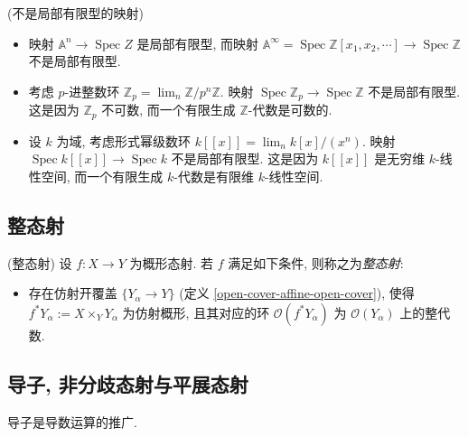 \documentclass{book}
\begin{document}
	\begin{example}
		{(不是局部有限型的映射)}
		\begin{itemize}
			\item 映射 $\mathbb A^n\to\operatorname{Spec} Z$ 是局部有限型, 而映射 $\mathbb A^{\infty}=\operatorname{Spec} \mathbb{Z}[x_1,x_2,\cdots] \to \operatorname{Spec} \mathbb{Z}$ 不是局部有限型.
			\item 考虑 $p$-进整数环 $\mathbb{Z}_p = \lim_n \mathbb{Z}/p^n\mathbb{Z}$. 映射 $\operatorname{Spec} \mathbb{Z}_p \to \operatorname{Spec} \mathbb{Z}$ 不是局部有限型.
			这是因为 $\mathbb{Z}_p$ 不可数, 而一个有限生成 $\mathbb{Z}$-代数是可数的.
			\item 设 $k$ 为域, 考虑形式幂级数环 $k[\![x]\!]=\lim_n k[x]/(x^n)$. 映射 $\operatorname{Spec} k[\![x]\!] \to \operatorname{Spec} k$ 不是局部有限型. 这是因为 $k[\![x]\!]$ 是无穷维 $k$-线性空间, 而一个有限生成 $k$-代数是有限维 $k$-线性空间.
		\end{itemize}
	\end{example}
	
	\subsection{整态射}
	
	\begin{definition}
		{(整态射)}
		设 $f\colon X\to Y$ 为概形态射. 若 $f$ 满足如下条件, 则称之为\emph{整态射}:
		\begin{itemize}
			\item 存在仿射开覆盖 $\{Y_\alpha \to Y\}$ (定义 \ref{open-cover-affine-open-cover}), 使得 $f^*Y_\alpha := X\times_Y Y_\alpha$ 为仿射概形, 且其对应的环 $\mathcal O(f^*Y_\alpha)$ 为 $\mathcal O(Y_\alpha)$ 上的整代数.
		\end{itemize}
	\end{definition}
	
	\subsection{导子, 非分歧态射与平展态射}
	
	导子是导数运算的推广.
	
\end{document}
